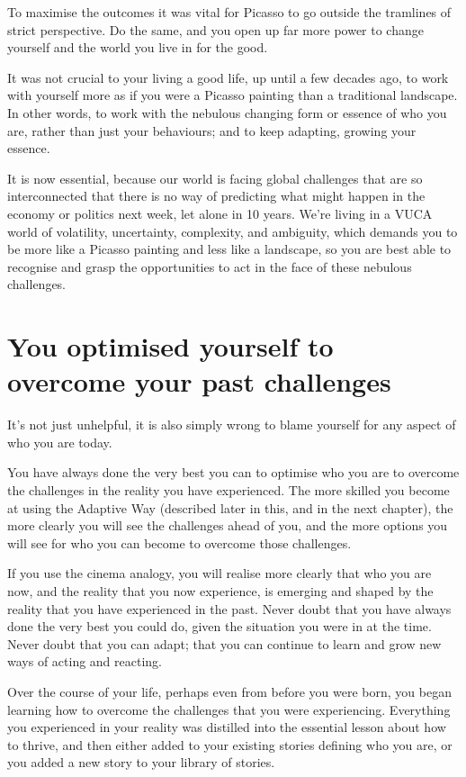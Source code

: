 To maximise the outcomes it was vital for Picasso to go outside the tramlines of strict perspective. Do the same, and you open up far more power to change yourself and the world you live in for the good.


It was not crucial to your living a good life, up until a few decades ago, to work with yourself more as if you were a Picasso painting than a traditional landscape. In other words, to work with the nebulous changing form or essence of who you are, rather than just your behaviours; and to keep adapting, growing your essence.


It is now essential, because our world is facing global challenges that are so interconnected that there is no way of predicting what might happen in the economy or politics next week, let alone in 10 years. We’re living in a VUCA  world of volatility, uncertainty, complexity, and ambiguity, which demands you to be more like a Picasso painting and less like a landscape, so you are best able to recognise and grasp the opportunities to act in the face of these nebulous challenges.
\section[You are optimised for past challenges]{You optimised yourself to overcome your past challenges}
\label{section:optimised-self}


It's not just unhelpful, it is also simply wrong to blame yourself for any aspect of who you are today. 


You have always done the very best you can to optimise who you are to overcome the challenges in the reality you have experienced. The more skilled you become at using the Adaptive Way (described later in this, and in the next chapter), the more clearly you will see the challenges ahead of you, and the more options you will see for who you can become to overcome those challenges.


If you use the cinema analogy, you will realise more clearly that who you are now, and the reality that you now experience, is emerging and shaped by the reality that you have experienced in the past. Never doubt that you have always done the very best you could do, given the situation you were in at the time. Never doubt that you can adapt; that you can continue to learn and grow new ways of acting and reacting.


Over the course of your life, perhaps even from before you were born, you began learning how to overcome the challenges that you were experiencing. Everything you experienced in your reality was distilled into the essential lesson about how to thrive, and then either added to your existing stories defining who you are, or you added a new story to your library of stories.


